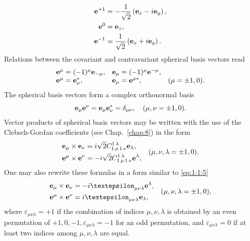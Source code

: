 \begin{align}
\mathbf{e}^{+1} & =-\frac{1}{\sqrt{2}}\left(\mathbf{e}_{x}-i \mathbf{e}_{y}\right) , \notag\\
\mathbf{e}^{0} & =\mathbf{e}_{z},  \label{eq:1:1:21}\\
\mathbf{e}^{-1} & =\frac{1}{\sqrt{2}}\left(\mathbf{e}_{x}+i \mathbf{e}_{y}\right) .\notag
\end{align}
Relations between the covariant and contravariant spherical basis vectors read
\begin{equation}
\begin{array}{lll}
\mathbf{e}^{\mu}=(-1)^{\mu} \mathbf{e}_{-\mu}, & \mathbf{e}_{\mu}=(-1)^{\mu} \mathbf{e}^{-\mu}, \\
\mathbf{e}^{\mu}=\mathbf{e}_{\mu}^{*}, & \mathbf{e}_{\mu}=\mathbf{e}^{\mu *}, & (\mu= \pm 1,0). 
\end{array}\label{eq:1:1:22}
\end{equation}
The spherical basis vectors form a complex orthonormal basis
\begin{equation}
\mathbf{e}_{\mu} \mathbf{e}^{\nu}=\mathbf{e}_{\mu} \mathbf{e}_{\nu}^{*}=\delta_{\mu \nu}, \quad(\mu, \nu= \pm 1,0) .\label{eq:1:1:23}
\end{equation}
Vector products of spherical basis vectors may be written with the use of the Clebsch-Gordan coefficients (see Chap.~\ref{chap:8}) in the form
\begin{equation}
  \begin{aligned}
& \mathbf{e}_{\mu} \times \mathbf{e}_{\nu}=i \sqrt{2} C_{1\,\mu\,1\,\nu}^{1\,\lambda} \mathbf{e}_{\lambda}, \\
& \mathbf{e}^{\mu} \times \mathbf{e}^{\nu}=-i \sqrt{2} C_{1\,\mu\,1\,\nu}^{1\,\lambda} \mathbf{e}^{\lambda},
\end{aligned}
 \quad(\mu, \nu, \lambda= \pm 1,0).
\end{equation}
One may also rewrite these formulas in a form similar to \eqref{eq:1:1:5}
\begin{equation}
\begin{aligned}
& \vect{e}_{\mu} \times \vect{e}_{\nu}=-i \varepsilon_{\mu \nu \lambda} \vect{e}^{\lambda},  \\
& \vect{e}^{\mu} \times \vect{e}^{\nu}=i \varepsilon_{\mu \nu \lambda} \vect{e}_{\lambda}, 
\end{aligned}
 \quad(\mu, \nu, \lambda= \pm 1,0),
\label{eq:1:1:25}
\end{equation}
where \(\varepsilon_{\mu \nu \lambda}=+1\) if the combination of indices \(\mu, \nu, \lambda\) is obtained by an even permutation of \(+1,0,-1, \varepsilon_{\mu \nu \lambda}=-1\) for an odd permutation, and \(\varepsilon_{\mu \nu \lambda}=0\) if at least two indices among \(\mu, \nu, \lambda\) are equal.

